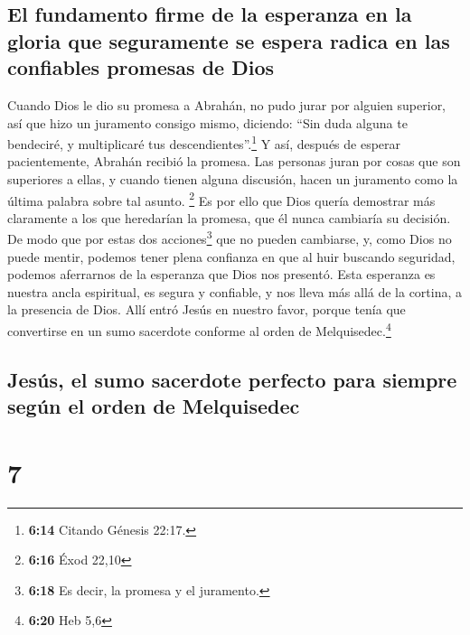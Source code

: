 \hypertarget{el-fundamento-firme-de-la-esperanza-en-la-gloria-que-seguramente-se-espera-radica-en-las-confiables-promesas-de-dios}{%
\subsection{El fundamento firme de la esperanza en la gloria que
seguramente se espera radica en las confiables promesas de
Dios}\label{el-fundamento-firme-de-la-esperanza-en-la-gloria-que-seguramente-se-espera-radica-en-las-confiables-promesas-de-dios}}

 Cuando Dios le dio su promesa a Abrahán, no pudo jurar
por alguien superior, así que hizo un juramento consigo mismo,
 diciendo: ``Sin duda alguna te bendeciré, y multiplicaré
tus descendientes''.\footnote{\textbf{6:14} Citando Génesis 22:17.}
 Y así, después de esperar pacientemente, Abrahán recibió
la promesa.  Las personas juran por cosas que son
superiores a ellas, y cuando tienen alguna discusión, hacen un juramento
como la última palabra sobre tal asunto. \footnote{\textbf{6:16} Éxod
  22,10}  Es por ello que Dios quería demostrar más
claramente a los que heredarían la promesa, que él nunca cambiaría su
decisión.  De modo que por estas dos acciones\footnote{\textbf{6:18}
  Es decir, la promesa y el juramento.} que no pueden cambiarse, y, como
Dios no puede mentir, podemos tener plena confianza en que al huir
buscando seguridad, podemos aferrarnos de la esperanza que Dios nos
presentó.  Esta esperanza es nuestra ancla espiritual, es
segura y confiable, y nos lleva más allá de la cortina, a la presencia
de Dios.  Allí entró Jesús en nuestro favor, porque tenía
que convertirse en un sumo sacerdote conforme al orden de
Melquisedec.\footnote{\textbf{6:20} Heb 5,6}

\hypertarget{jesuxfas-el-sumo-sacerdote-perfecto-para-siempre-seguxfan-el-orden-de-melquisedec}{%
\subsection{Jesús, el sumo sacerdote perfecto para siempre según el
orden de
Melquisedec}\label{jesuxfas-el-sumo-sacerdote-perfecto-para-siempre-seguxfan-el-orden-de-melquisedec}}

\hypertarget{section-6}{%
\section{7}\label{section-6}}

